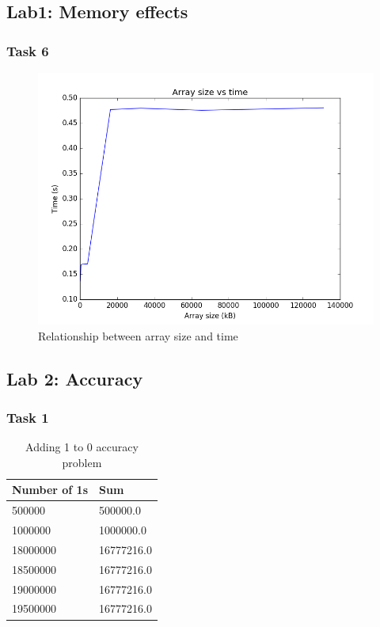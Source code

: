 \documentclass[12pt]{article}
\begin{document}
\subsection*{Lab1: Memory effects}

  \subsubsection*{Task 6}
    \begin{figure}[ht]
      \centering
      \includegraphics[width=0.5\linewidth]{lab1_task6}
      \caption{Relationship between array size and time}
      \label{fig:task6_memory}
    \end{figure}

\subsection*{Lab 2: Accuracy}

  \subsubsection*{Task 1}
  \begin{table}[H]
    \centering
    \begin{tabular}{|l|l|}
      \hline
      Number of 1s & Sum        \\ \hline
      500000       & 500000.0   \\ \hline
      1000000      & 1000000.0  \\ \hline
      18000000     & 16777216.0 \\ \hline
      18500000     & 16777216.0 \\ \hline
      19000000     & 16777216.0 \\ \hline
      19500000     & 16777216.0 \\ \hline
    \end{tabular}
    \caption{Adding 1 to 0 accuracy problem}
    \label{fig:lab2_task1}
  \end{table}
\end{document}
